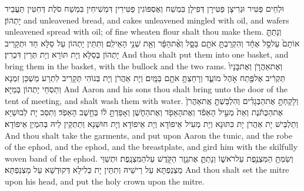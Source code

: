 {וּלְחֵים פַּטִּיר וּגְרִיצָן פַּטִּירָן דְּפִילָן בִּמְשַׁח וְאֶסְפּוֹגִין פַּטִּירִין דִּמְשִׁיחִין בִּמְשַׁח סֹלֶת דְּחִטִּין תַּעֲבֵיד יָתְהוֹן׃}
{and unleavened bread, and cakes unleavened mingled with oil, and wafers unleavened spread with oil; of fine wheaten flour shalt thou make them.}{}
{וְנָתַתָּ֤ אוֹתָם֙ עַל\maqqaf סַ֣ל אֶחָ֔ד וְהִקְרַבְתָּ֥ אֹתָ֖ם בַּסָּ֑ל וְאֶ֨ת\maqqaf הַפָּ֔ר וְאֵ֖ת שְׁנֵ֥י הָאֵילִֽם׃}
{וְתִתֵּין יָתְהוֹן עַל סַלָּא חַד וּתְקָרֵיב יָתְהוֹן בְּסַלָּא וְיָת תּוֹרָא וְיָת תְּרֵין דִּכְרִין׃}
{And thou shalt put them into one basket, and bring them in the basket, with the bullock and the two rams.}{}
{וְאֶת\maqqaf אַהֲרֹ֤ן וְאֶת\maqqaf בָּנָיו֙ תַּקְרִ֔יב אֶל\maqqaf פֶּ֖תַח אֹ֣הֶל מוֹעֵ֑ד וְרָחַצְתָּ֥ אֹתָ֖ם בַּמָּֽיִם׃}
{וְיָת אַהֲרֹן וְיָת בְּנוֹהִי תְּקָרֵיב לִתְרַע מַשְׁכַּן זִמְנָא וְתַסְחֵי יָתְהוֹן בְּמַיָּא׃}
{And Aaron and his sons thou shalt bring unto the door of the tent of meeting, and shalt wash them with water.}{}
{וְלָקַחְתָּ֣ אֶת\maqqaf הַבְּגָדִ֗ים וְהִלְבַּשְׁתָּ֤ אֶֽת\maqqaf אַהֲרֹן֙ אֶת\maqqaf הַכֻּתֹּ֔נֶת וְאֵת֙ מְעִ֣יל הָאֵפֹ֔ד וְאֶת\maqqaf הָאֵפֹ֖ד וְאֶת\maqqaf הַחֹ֑שֶׁן וְאָפַדְתָּ֣ ל֔וֹ בְּחֵ֖שֶׁב הָאֵפֹֽד׃}
{וְתִסַּב יָת לְבוּשַׁיָּא וְתַלְבֵּישׁ יָת אַהֲרֹן יָת כִּתּוּנָא וְיָת מְעִיל אֵיפוֹדָא וְיָת אֵיפוֹדָא וְיָת חוּשְׁנָא וְתַתְקֵין לֵיהּ בְּהִמְיַן אֵיפוֹדָא׃}
{And thou shalt take the garments, and put upon Aaron the tunic, and the robe of the ephod, and the ephod, and the breastplate, and gird him with the skilfully woven band of the ephod.}{}
{וְשַׂמְתָּ֥ הַמִּצְנֶ֖פֶת עַל\maqqaf רֹאשׁ֑וֹ וְנָתַתָּ֛ אֶת\maqqaf נֵ֥זֶר הַקֹּ֖דֶשׁ עַל\maqqaf הַמִּצְנָֽפֶת׃}
{וּתְשַׁוֵּי מַצְנַפְתָּא עַל רֵישֵׁיהּ וְתִתֵּין יָת כְּלִילָא דְּקוּדְשָׁא עַל מַצְנַפְתָּא׃}
{And thou shalt set the mitre upon his head, and put the holy crown upon the mitre.}{}
